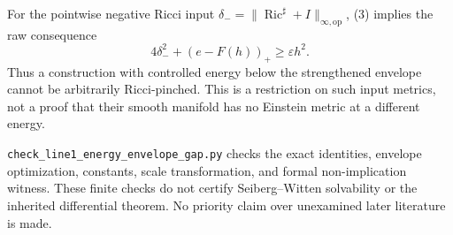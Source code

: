\documentclass[
  11pt,
]{article}
\begin{document}
For the pointwise negative Ricci input
\(\delta_-=\|\operatorname{Ric}^{\sharp}+I\|_{\infty,\mathrm{op}}\), (3)
implies the raw consequence \[
 4\delta_-^2+(e-F(h))_+\ge\varepsilon h^2.
 \tag{18}
\] Thus a construction with controlled energy below the strengthened
envelope cannot be arbitrarily Ricci-pinched. This is a restriction on
such input metrics, not a proof that their smooth manifold has no
Einstein metric at a different energy.

\texttt{check\_line1\_energy\_envelope\_gap.py} checks the exact
identities, envelope optimization, constants, scale transformation, and
formal non-implication witness. These finite checks do not certify
Seiberg--Witten solvability or the inherited differential theorem. No
priority claim over unexamined later literature is made.
\end{document}
